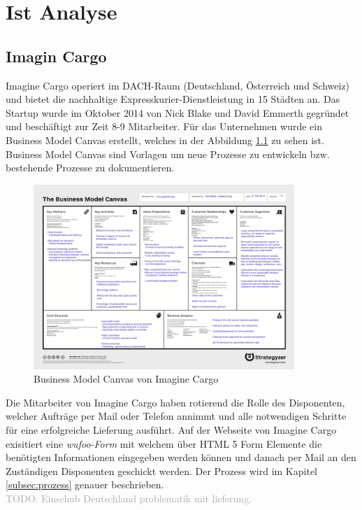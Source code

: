 \chapter{Ist Analyse}
\label{sec:istanalyse}
\section{Imagin Cargo}
Imagine Cargo operiert im DACH-Raum (Deutschland, Österreich und Schweiz) und bietet die nachhaltige Expresskurier-Dienstleistung in 15 Städten an. Das Startup wurde im Oktober 2014 von Nick Blake und David Emmerth gegründet und beschäftigt zur Zeit 8-9 Mitarbeiter. Für das Unternehmen wurde ein Business Model Canvas erstellt, welches in der Abbildung \ref{fig1:businessmodelcanvas} zu sehen ist. Business Model Canvas sind Vorlagen um neue Prozesse zu entwickeln bzw. bestehende Prozesse zu dokumentieren.
\begin{figure}[ht]
	\centering
  \includegraphics[width=0.88\textwidth]{images/businessModelCanvas.png}
	\caption{Business Model Canvas von Imagine Cargo}
	\label{fig1:businessmodelcanvas}
\end{figure}
 Die Mitarbeiter von Imagine Cargo haben rotierend die Rolle des Disponenten, welcher Aufträge per Mail oder Telefon annimmt und alle notwendigen Schritte für eine erfolgreiche Lieferung ausführt. Auf der Webseite von Imagine Cargo exisitiert eine \textit{wufoo-Form} mit welchem über HTML 5 Form Elemente die benötigten Informationen eingegeben werden können und danach per Mail an den Zuständigen Disponenten geschickt werden. Der Prozess wird im Kapitel \ref{subsec:prozess} genauer beschrieben.
\\
\textcolor{darkgray}{
  TODO: Einschub Deutschland problematik mit lieferung.
}


